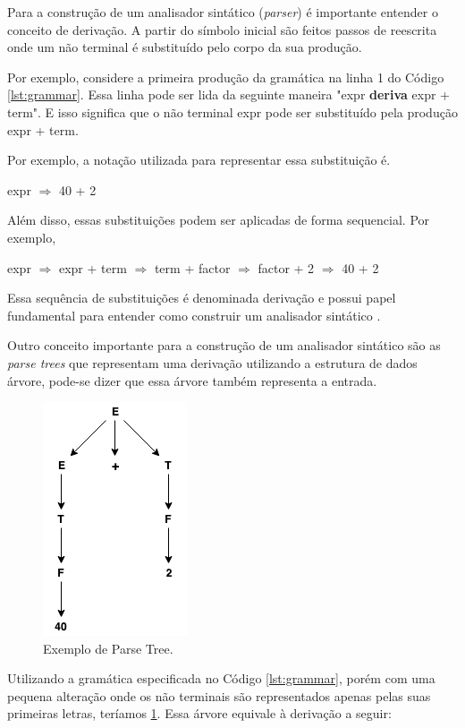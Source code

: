 Para a construção de um analisador sintático (\textit{parser}) é importante entender o conceito de derivação. 
A partir do símbolo inicial são feitos passos de reescrita onde um não terminal é substituído pelo
corpo da sua produção. 

Por exemplo, considere a primeira produção da gramática na linha 1 do Código \ref{lst:grammar}. 
Essa linha pode ser lida da seguinte maneira "expr \textbf{deriva} expr + term". 
E isso significa que o não terminal expr pode ser substituído pela produção expr + term. 

Por exemplo, a notação utilizada para representar essa substituição é.
\begin{center}
expr $\Rightarrow$ 40 + 2
\end{center}
Além disso, essas substituições podem ser aplicadas de forma sequencial. Por exemplo,
\begin{center}
    expr $\Rightarrow$ expr + term $\Rightarrow$ term + factor $\Rightarrow$ factor + 2 $\Rightarrow$ 40 + 2
\end{center}
Essa sequência de substituições é denominada derivação e possui papel fundamental para entender
como construir um analisador sintático \cite{aho2006}. 

Outro conceito importante para a construção de um analisador sintático são
as \textit{parse trees} que representam uma derivação utilizando a estrutura de dados árvore, 
pode-se dizer que essa árvore também representa a entrada.

\begin{figure}[h]
	\centering
	\includegraphics[keepaspectratio=true,scale=1]{figuras/parsetree.png}
	\caption{Exemplo de Parse Tree.}
	\label{fig:parsetree}
\end{figure}

Utilizando a gramática especificada no Código \ref{lst:grammar}, porém com uma pequena alteração
onde os não terminais são representados apenas pelas suas primeiras letras, teríamos \ref{fig:parsetree}. 
Essa árvore equivale à derivação a seguir:


